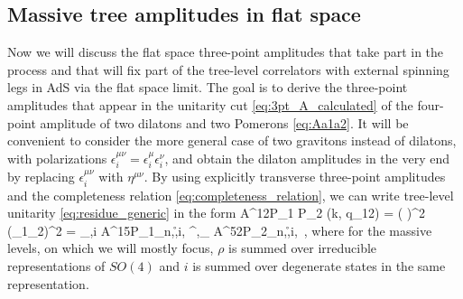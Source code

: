 \subsection{Massive tree amplitudes in flat space}
\label{sec:massive_tree_flat}


Now we will discuss the flat space three-point amplitudes that take part in the process and that will fix part of the tree-level correlators with external spinning legs in AdS via the flat space limit. 
The goal is to derive the three-point amplitudes that appear in the unitarity cut \eqref{eq:3pt_A_calculated} of the
four-point amplitude of two dilatons and two Pomerons \eqref{eq:Aa1a2}. It will be convenient to consider the more general case of two gravitons instead of dilatons, with polarizations $\epsilon_i^{\mu\nu}=\epsilon_i^{\mu}\epsilon_i^{\nu}$, and obtain the dilaton amplitudes in the very end by replacing $\epsilon_i^{\mu\nu}$ with $\eta^{\mu\nu}$.
By using explicitly transverse three-point amplitudes and the completeness relation \eqref{eq:completeness_relation}, we can write tree-level unitarity \eqref{eq:residue_generic}
in the form
	\beq
		 A^{12P_1 P_2} (k, q_{12})
		= \left(  \right)^2 (\epsilon_1\cdot \epsilon_2)^2
		= \sum\limits_{\rho,i} A^{15P_1}_{n,\r,i,}
\pi^{,}_{\rho}
		A^{52P_2}_{n,\r,i,} \,,
		\label{eq:A12_cut}
	\eeq
where for the massive levels, on which we will mostly focus, $\rho$ is summed over irreducible representations of $SO(4)$ and $i$ is summed over degenerate states in the same representation.

